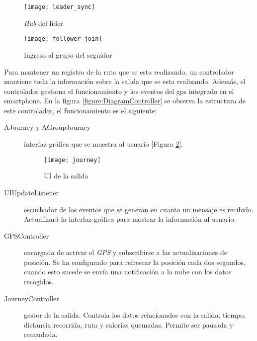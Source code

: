 \begin{figure}[H]
	\begin{minipage}{.5\textwidth}
		\begin{center}
			\texttt{[image: leader\_sync]}
			\caption{\emph{Hub} del líder}
			\label{figure:Hub}
		\end{center}
	\end{minipage}
\begin{minipage}{.5\textwidth}
	\begin{center}
		\texttt{[image: follower\_join]}
		\caption{Ingreso al grupo del seguidor}
		\label{figure:FollowerJoin}
	\end{center}
\end{minipage}
\end{figure}

Para mantener un registro de la ruta que se esta realizando, un controlador mantiene
toda la información sobre la salida que se esta realizando. Además, el controlador
gestiona el funcionamiento y los eventos del \gls{gps} integrado en el smartphone. En la figura
\ref{figure:DiagramController} se observa la estructura de este controlador, el
funcionamiento es el siguiente:
\begin{description}
	\item[AJourney y AGroupJourney] interfaz gráfica que se muestra al usuario
	[Figura \ref{figure:Journey}].

	\begin{figure}[H]
		\begin{center}
			\texttt{[image: journey]}
			\caption{UI de la salida}
			\label{figure:Journey}
		\end{center}
	\end{figure}

	\item[UIUpdateListener] escuchador de los eventos que se generan en cuanto un
	mensaje es recibido. Actualizará la interfaz gráfica para mostrar la información
	al usuario.

	\item[GPSController] encargada de activar el \emph{GPS} y subscribirse a las
	actualizaciones de posición. Se ha configurado para refrescar la posición cada
	dos segundos, cuando esto sucede se envía una notificación a la nube con los
	datos recogidos.

	\item[JourneyController] gestor de la salida. Controla los datos relacionados
	con la salida: tiempo, distancia recorrida, ruta y calorías quemadas. Permite
	ser pausada y reanudada.
\end{description}

